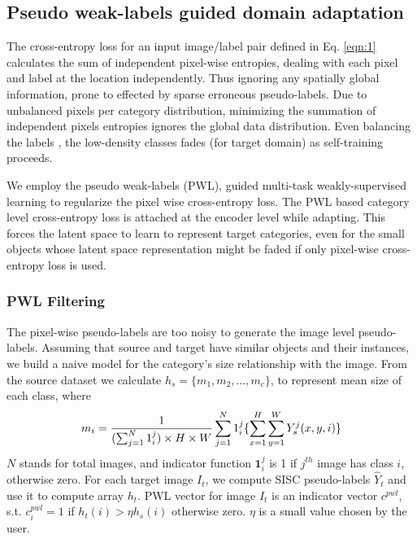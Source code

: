 \documentclass[10pt,twocolumn,letterpaper]{article}
\begin{document}
\subsection{Pseudo weak-labels guided domain adaptation}
\label{sec:pwl}

The cross-entropy loss for an input image/label pair defined in Eq. \ref{eqn:1} calculates the sum of independent pixel-wise entropies, dealing with each pixel and label at the location independently. 
Thus ignoring any spatially global information, prone to effected by sparse erroneous pseudo-labels. 
Due to unbalanced pixels per category distribution, minimizing the summation of independent pixels entropies ignores the global data distribution. Even balancing the labels \cite{zou2018unsupervised}, the low-density classes fades (for target domain) as self-training proceeds. 

We employ the pseudo weak-labels (PWL), guided multi-task weakly-supervised learning to regularize the pixel wise cross-entropy loss. 
The PWL based category level cross-entropy loss is attached at the encoder level while adapting. This forces the latent space to learn to represent target categories, even for the small objects whose latent space representation might be faded if only pixel-wise cross-entropy loss is used. 


\subsubsection{PWL Filtering}
\label{sec:pwlFiltering}
The pixel-wise pseudo-labels are too noisy to generate the image level pseudo-labels. 
Assuming that source and target have similar objects and their instances, we build a naive model for the category's size relationship with the image. 
From the source dataset we calculate $h_s = \{ m_1, m_2, \dots, m_c\}$, to represent mean size of each class, where
\begin{equation}
\footnotesize
m_i = \frac{1}{(\sum_{j=1}^{N}1_{i}^{j}) \times H \times W} \sum_{j=1}^{N} 1_{i}^{j}  \{\sum_{x=1}^{H}\sum_{y=1}^{W} Y_s^j(x,y,i)\}
\label{eqn:4}
\end{equation}
$N$ stands for total images, and indicator function $\mathbf{1}_i^j$ is 1 if $j^{th}$ image has class $i$, otherwise zero.
For each target image $I_t$, we compute SISC pseudo-labels $\hat{Y}_t$ and use it to compute array $h_t$. PWL vector for image $I_t$ is an indicator vector $c^{pwl}$, s.t. $c^{pwl}_i=1$ if $h_t(i)>\eta h_s(i)$ otherwise zero.   $\eta$ is a small value chosen by the user.
\end{document}
